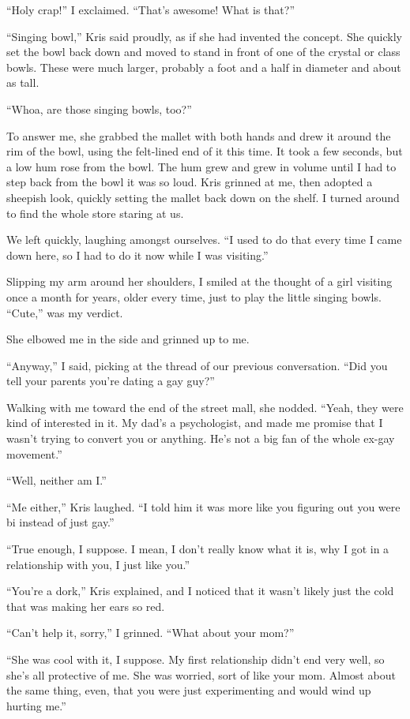 ``Holy crap!'' I exclaimed.  ``That's awesome!  What is that?''

``Singing bowl,'' Kris said proudly, as if she had invented the concept.  She quickly set the bowl back down and moved to stand in front of one of the crystal or class bowls.  These were much larger, probably a foot and a half in diameter and about as tall.

``Whoa, are those singing bowls, too?''

To answer me, she grabbed the mallet with both hands and drew it around the rim of the bowl, using the felt-lined end of it this time.  It took a few seconds, but a low hum rose from the bowl.  The hum grew and grew in volume until I had to step back from the bowl it was so loud.  Kris grinned at me, then adopted a sheepish look, quickly setting the mallet back down on the shelf.  I turned around to find the whole store staring at us.

We left quickly, laughing amongst ourselves.  ``I used to do that every time I came down here, so I had to do it now while I was visiting.''

Slipping my arm around her shoulders, I smiled at the thought of a girl visiting once a month for years, older every time, just to play the little singing bowls.  ``Cute,'' was my verdict.

She elbowed me in the side and grinned up to me.

``Anyway,'' I said, picking at the thread of our previous conversation.  ``Did you tell your parents you're dating a gay guy?''

Walking with me toward the end of the street mall, she nodded.  ``Yeah, they were kind of interested in it.  My dad's a psychologist, and made me promise that I wasn't trying to convert you or anything.  He's not a big fan of the whole ex-gay movement.''

``Well, neither am I.''

``Me either,'' Kris laughed.  ``I told him it was more like you figuring out you were bi instead of just gay.''

``True enough, I suppose.  I mean, I don't really know what it is, why I got in a relationship with you, I just like you.''

``You're a dork,'' Kris explained, and I noticed that it wasn't likely just the cold that was making her ears so red.

``Can't help it, sorry,'' I grinned.  ``What about your mom?''

``She was cool with it, I suppose.  My first relationship didn't end very well, so she's all protective of me.  She was worried, sort of like your mom.  Almost about the same thing, even, that you were just experimenting and would wind up hurting me.''

